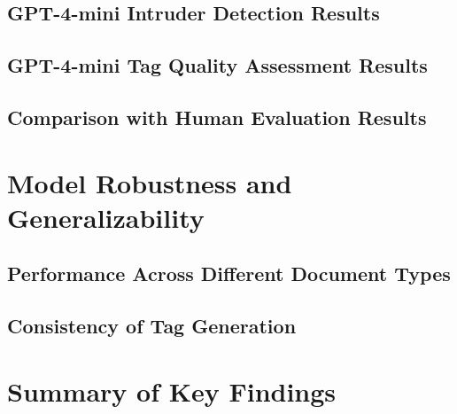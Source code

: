 \subsection{GPT-4-mini Intruder Detection Results}
\subsection{GPT-4-mini Tag Quality Assessment Results}
\subsection{Comparison with Human Evaluation Results}

\section{Model Robustness and Generalizability}
\subsection{Performance Across Different Document Types}
\subsection{Consistency of Tag Generation}

\section{Summary of Key Findings}